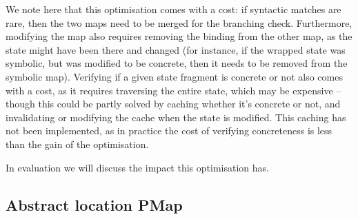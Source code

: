 
We note here that this optimisation comes with a cost: if syntactic matches are rare, then the two maps need to be merged for the branching check. Furthermore, modifying the map also requires removing the binding from the other map, as the state might have been there and changed (for instance, if the wrapped state was symbolic, but was modified to be concrete, then it needs to be removed from the symbolic map). Verifying if a given state fragment is concrete or not also comes with a cost, as it requires traversing the entire state, which may be expensive -- though this could be partly solved by caching whether it's concrete or not, and invalidating or modifying the cache when the state is modified. This caching has not been implemented, as in practice the cost of verifying concreteness is less than the gain of the optimisation.

In evaluation we will discuss the impact this optimisation has. 

\subsection{Abstract location PMap}


